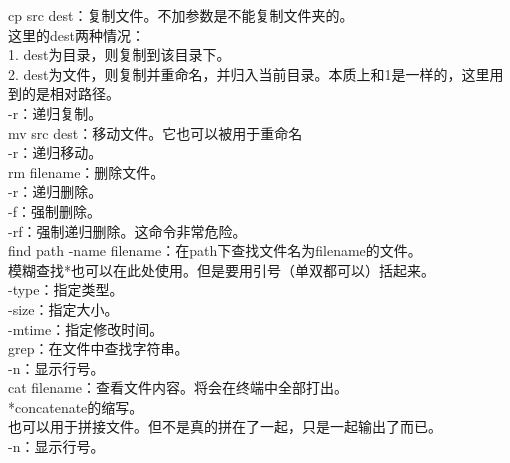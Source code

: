 \documentclass{article}
\begin{document}
\noindent
cp src dest：复制文件。不加参数是不能复制文件夹的。\\
这里的dest两种情况：\\
1. dest为目录，则复制到该目录下。\\
2. dest为文件，则复制并重命名，并归入当前目录。本质上和1是一样的，这里用到的是相对路径。\\
\hspace*{2em} -r：递归复制。\\

\noindent
mv src dest：移动文件。它也可以被用于重命名\\
\hspace*{2em} -r：递归移动。\\

\noindent
rm filename：删除文件。\\
\hspace*{2em} -r：递归删除。\\
\hspace*{2em} -f：强制删除。\\
\hspace*{2em} -rf：强制递归删除。这命令非常危险。\\

\noindent
find path -name filename：在path下查找文件名为filename的文件。\\
\hspace*{2em} 模糊查找*也可以在此处使用。但是要用引号（单双都可以）括起来。\\
\hspace*{2em} -type：指定类型。\\
\hspace*{2em} -size：指定大小。\\
\hspace*{2em} -mtime：指定修改时间。\\
grep：在文件中查找字符串。\\
\hspace*{2em} -n：显示行号。\\

\noindent
cat filename：查看文件内容。将会在终端中全部打出。\\
\hspace*{2em} *concatenate的缩写。\\
\hspace*{2em} 也可以用于拼接文件。但不是真的拼在了一起，只是一起输出了而已。\\
\hspace*{2em} -n：显示行号。\\
\end{document}
